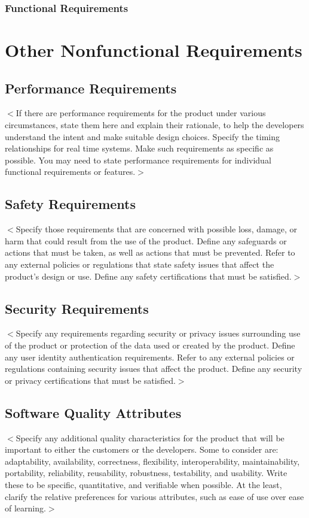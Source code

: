 \documentclass{scrreprt}
\begin{document}
\subsection{Functional Requirements}



\chapter{Other Nonfunctional Requirements}



\section{Performance Requirements}
$<$If there are performance requirements for the product under various 
circumstances, state them here and explain their rationale, to help the 
developers understand the intent and make suitable design choices. Specify the 
timing relationships for real time systems. Make such requirements as specific 
as possible. You may need to state performance requirements for individual 
functional requirements or features.$>$

\section{Safety Requirements}
$<$Specify those requirements that are concerned with possible loss, damage, or 
harm that could result from the use of the product. Define any safeguards or 
actions that must be taken, as well as actions that must be prevented. Refer to 
any external policies or regulations that state safety issues that affect the 
product’s design or use. Define any safety certifications that must be 
satisfied.$>$

\section{Security Requirements}
$<$Specify any requirements regarding security or privacy issues surrounding use 
of the product or protection of the data used or created by the product. Define 
any user identity authentication requirements. Refer to any external policies or 
regulations containing security issues that affect the product. Define any 
security or privacy certifications that must be satisfied.$>$

\section{Software Quality Attributes}
$<$Specify any additional quality characteristics for the product that will be 
important to either the customers or the developers. Some to consider are: 
adaptability, availability, correctness, flexibility, interoperability, 
maintainability, portability, reliability, reusability, robustness, testability, 
and usability. Write these to be specific, quantitative, and verifiable when 
possible. At the least, clarify the relative preferences for various attributes, 
such as ease of use over ease of learning.$>$
\end{document}
